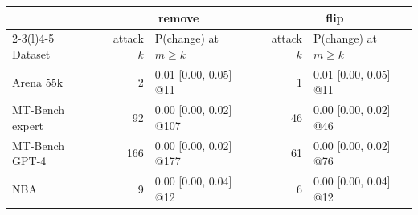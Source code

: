 {\footnotesize\setlength{\tabcolsep}{3pt}\begin{tabular}{@{}lrlrl@{}}\toprule
 & \multicolumn{2}{c}{remove} & \multicolumn{2}{c}{flip}\\
\cmidrule(lr){2-3}\cmidrule(l){4-5}
Dataset & attack $k$ & P(change) at $m\ge k$ & attack $k$ & P(change) at $m\ge k$\\\midrule
Arena 55k & 2 & 0.01 [0.00, 0.05] @11 & 1 & 0.01 [0.00, 0.05] @11 \\
MT-Bench expert & 92 & 0.00 [0.00, 0.02] @107 & 46 & 0.00 [0.00, 0.02] @46 \\
MT-Bench GPT-4 & 166 & 0.00 [0.00, 0.02] @177 & 61 & 0.00 [0.00, 0.02] @76 \\
NBA & 9 & 0.00 [0.00, 0.04] @12 & 6 & 0.00 [0.00, 0.04] @12 \\
\bottomrule\end{tabular}}
